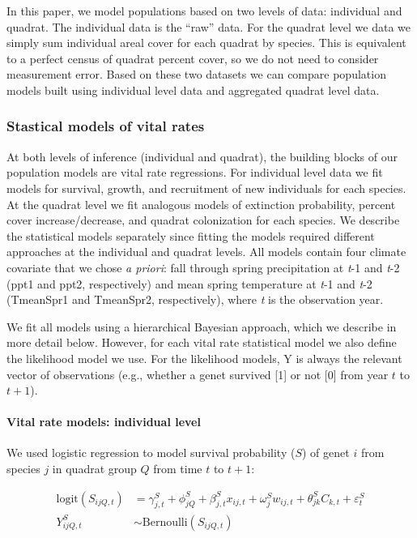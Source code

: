 \documentclass[12pt,]{article}
\begin{document}
In this paper, we model populations based on two levels of data:
individual and quadrat. The individual data is the ``raw'' data. For the
quadrat level we data we simply sum individual areal cover for each
quadrat by species. This is equivalent to a perfect census of quadrat
percent cover, so we do not need to consider measurement error. Based on
these two datasets we can compare population models built using
individual level data and aggregated quadrat level data.

\subsubsection{Stastical models of vital
rates}\label{stastical-models-of-vital-rates}

At both levels of inference (individual and quadrat), the building
blocks of our population models are vital rate regressions. For
individual level data we fit models for survival, growth, and
recruitment of new individuals for each species. At the quadrat level we
fit analogous models of extinction probability, percent cover
increase/decrease, and quadrat colonization for each species. We
describe the statistical models separately since fitting the models
required different approaches at the individual and quadrat levels. All
models contain four climate covariate that we chose \emph{a priori}:
fall through spring precipitation at \emph{t}-1 and \emph{t}-2 (ppt1 and
ppt2, respectively) and mean spring temperature at \emph{t}-1 and
\emph{t}-2 (TmeanSpr1 and TmeanSpr2, respectively), where \emph{t} is
the observation year.

We fit all models using a hierarchical Bayesian approach, which we
describe in more detail below. However, for each vital rate statistical
model we also define the likelihood model we use. For the likelihood
models, Y is always the relevant vector of observations (e.g., whether a
genet survived {[}1{]} or not {[}0{]} from year $t$ to $t+1$).

\paragraph{Vital rate models: individual
level}\label{vital-rate-models-individual-level}

We used logistic regression to model survival probability ($S$) of genet
$i$ from species $j$ in quadrat group $Q$ from time $t$ to $t+1$:

\begin{align}
\text{logit}(S_{ijQ,t}) &= \gamma^{S}_{j,t} + \phi^{S}_{jQ} + \beta^{S}_{j,t}x_{ij,t} + \omega^{S}_{j}w_{ij,t} + \theta^{S}_{jk}C_{k,t} + \varepsilon^{S}_{t} \\
Y^{S}_{ijQ,t} &\sim \text{Bernoulli}(S_{ijQ,t})
\end{align}
\end{document}
